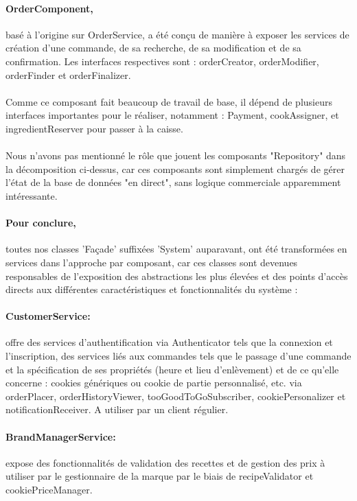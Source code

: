 \paragraph{OrderComponent,} basé à l'origine sur OrderService, a été conçu de manière à exposer les services de création d'une commande, de sa recherche, de sa modification et de sa confirmation. Les interfaces respectives sont : orderCreator, orderModifier, orderFinder et orderFinalizer. 

\paragraph{}Comme ce composant fait beaucoup de travail de base, il dépend de plusieurs interfaces importantes pour le réaliser, notamment : Payment, cookAssigner, et ingredientReserver pour passer à la caisse.
\paragraph{}Nous n'avons pas mentionné le rôle que jouent les composants "Repository" dans la décomposition ci-dessus, car ces composants sont simplement chargés de gérer l'état de la base de données "en direct", sans logique commerciale apparemment intéressante.
\paragraph{Pour conclure,} toutes nos classes 'Façade' suffixées 'System' auparavant, ont été transformées en services dans l'approche par composant, car ces classes sont devenues responsables de l'exposition des abstractions les plus élevées et des points d'accès directs aux différentes caractéristiques et fonctionnalités du système :
\paragraph{CustomerService:} offre des services d'authentification via Authenticator tels que la connexion et l'inscription, des services liés aux commandes tels que le passage d'une commande et la spécification de ses propriétés (heure et lieu d'enlèvement) et de ce qu'elle concerne : cookies génériques ou cookie de partie personnalisé, etc. via orderPlacer, orderHistoryViewer, tooGoodToGoSubscriber, cookiePersonalizer et notificationReceiver. A utiliser par un client régulier.
\paragraph{BrandManagerService:} expose des fonctionnalités de validation des recettes et de gestion des prix à utiliser par le gestionnaire de la marque par le biais de recipeValidator et cookiePriceManager.
